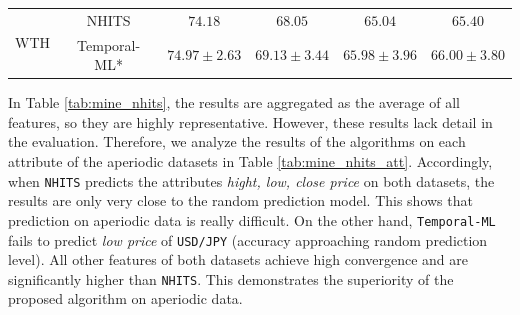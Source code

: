 \documentclass[a4paper,fleqn]{cas-sc}
\begin{document}
\begin{table}[H]
\begin{tabular}{c|c|cccc}
        \hline
        \multirow{2}{*}{WTH}		        & NHITS                   & $74.18$                 & $68.05$                 & $65.04$                 & $65.40$             \\
                                            & Temporal-ML\mbox{*}     & $\mathbf{74.97\pm2.63}$ & $\mathbf{69.13\pm3.44}$ & $\mathbf{65.98\pm3.96}$ & $\mathbf{66.00\pm3.80}$    \\
        \bottomrule
        \end{tabular}
\end{table}

In Table \ref{tab:mine_nhits}, the results are aggregated as the average of all features, so they are highly representative. However, these results lack detail in the evaluation. Therefore, we analyze the results of the algorithms on each attribute of the aperiodic datasets in Table \ref{tab:mine_nhits_att}. Accordingly, when \verb|NHITS| predicts the attributes \textit{hight, low, close price} on both datasets, the results are only very close to the random prediction model. This shows that prediction on aperiodic data is really difficult. On the other hand, \verb|Temporal-ML| fails to predict \textit{low price} of \verb|USD/JPY| (accuracy approaching random prediction level). All other features of both datasets achieve high convergence and are significantly higher than \verb|NHITS|. This demonstrates the superiority of the proposed algorithm on aperiodic data.

\vspace{1mm}
\end{document}
